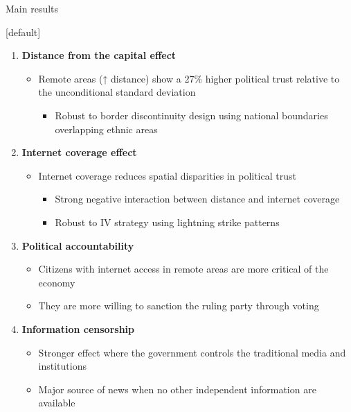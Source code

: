 \documentclass[10pt]{beamer}
\begin{document}
            
\begin{frame}{Main results}

    [default]
    \begin{enumerate}\setlength\itemsep{0.5em}
        \item {}\textcolor{rougeprez}{\textbf{Distance from the capital effect}}\\
        \begin{itemize}
            \item Remote areas (↑ distance) show a 27\% higher political trust relative to the unconditional standard deviation
            \begin{itemize}
                \item Robust to border discontinuity design using national boundaries overlapping ethnic areas  \pause
            \end{itemize}
        \end{itemize}
        \item {}\textcolor{rougeprez}{\textbf{Internet coverage effect}}\\
        \begin{itemize}
            \item Internet coverage reduces spatial disparities in political trust
            \begin{itemize}
                \item Strong negative interaction between distance and internet coverage
                \item Robust to IV strategy using lightning strike patterns  \pause
            \end{itemize}
        \end{itemize}
        \item {}\textcolor{rougeprez}{\textbf{Political accountability}}\\
            \begin{itemize}
                \item Citizens with internet access in remote areas are more critical of the economy
                \item They are more willing to sanction the ruling party through voting  \pause
            \end{itemize}
        \item  {}\textcolor{rougeprez}{\textbf{Information censorship}}
        \begin{itemize}
            \item Stronger effect where the government controls the traditional media and institutions
            \item Major source of news when no other independent information are available  \pause
        \end{itemize}
        

\end{enumerate}
\end{frame}
\end{document}
